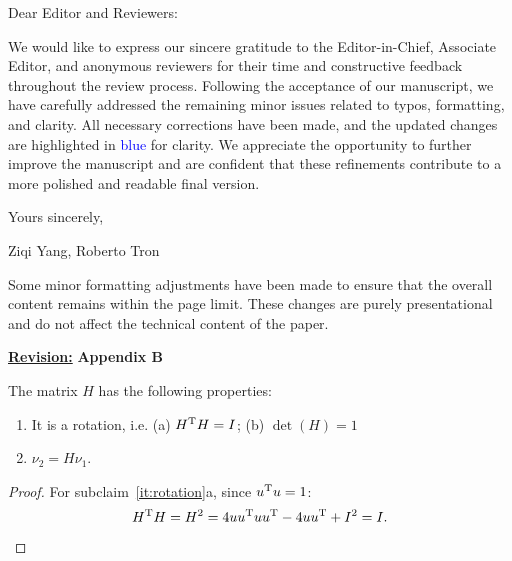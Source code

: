\documentclass{article}
\newcommand{\rv}{{\large{\underline{\textbf{Revision:}}}}\quad}
\newcommand{\new}[1]{\textcolor{blue}{#1}}
\newcommand{\news}{\color{blue}}
\begin{document}
	




\noindent
Dear Editor and Reviewers:

\vspace{0.2cm}
\noindent
We would like to express our sincere gratitude to the Editor-in-Chief, Associate Editor, and anonymous reviewers for their time and constructive feedback throughout the review process. Following the acceptance of our manuscript, we have carefully addressed the remaining minor issues related to typos, formatting, and clarity. All necessary corrections have been made, and the updated changes are highlighted in \new{blue} for clarity. We appreciate the opportunity to further improve the manuscript and are confident that these refinements contribute to a more polished and readable final version.

\vspace{0.2cm}
\noindent
Yours sincerely,

\noindent
Ziqi Yang, Roberto Tron

\vspace{1cm}
\begin{cmt*}{}{}
Some minor formatting adjustments have been made to ensure that the overall content remains within the page limit. These changes are purely presentational and do not affect the technical content of the paper.
\end{cmt*}
\rv 
\textbf{Appendix B}
\setcounter{proposition}{2}
\begin{proposition}\label{prop:HProperty}
 {\news The matrix $H$ has the following properties:
  \begin{enumerate}
  \item\label{it:rotation} It is a rotation, i.e. (a) $H^\mathrm{T} H=I$; (b) $\det(H)=1$
  \item\label{it:transformation} $\nu_2=H \nu_1$.
  \end{enumerate}}
\end{proposition}
\begin{proof}
 {\news For subclaim~\ref{it:rotation}a,  since $u^\mathrm{T} u=1$:
  \begin{equation}
    H^\mathrm{T} H=H^2=4uu^\mathrm{T} u u^\mathrm{T} - 4uu^\mathrm{T} +I^2=I.
  \end{equation}}
\end{proof}
\newpage
\end{document}
